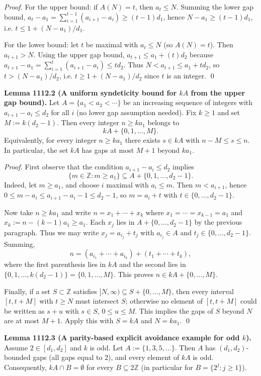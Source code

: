 \emph{Proof.}
For the upper bound: if \(A(N)=t\), then \(a_t\le N\). Summing the lower gap bound,
\(a_t-a_1=\sum_{i=1}^{t-1}(a_{i+1}-a_i)\ge (t-1)d_1\), hence \(N-a_1\ge (t-1)d_1\), i.e.
\(t\le 1+(N-a_1)/d_1\).

For the lower bound: let \(t\) be maximal with \(a_t\le N\) (so \(A(N)=t\)). Then
\(a_{t+1}>N\). Using the upper gap bound,
\(a_{t+1}\le a_1+(t)d_2\) because
\(a_{t+1}-a_1=\sum_{i=1}^{t}(a_{i+1}-a_i)\le t d_2\).
Thus \(N<a_{t+1}\le a_1+t d_2\), so \(t> (N-a_1)/d_2\), i.e.
\(t\ge 1+(N-a_1)/d_2\) since \(t\) is an integer. \qed

\textbf{Lemma 1112.2 (A uniform syndeticity bound for \(kA\) from the upper gap bound).}
Let \(A=\{a_1<a_2<\cdots\}\) be an increasing sequence of integers with \(a_{i+1}-a_i\le d_2\) for all \(i\) (no lower gap assumption needed). Fix \(k\ge 1\) and set
\(M:=k(d_2-1)\).
Then every integer \(n\ge k a_1\) belongs to
\[
 kA + \{0,1,\dots,M\}.
\]
Equivalently, for every integer \(n\ge k a_1\) there exists \(s\in kA\) with \(n-M\le s\le n\). In particular, the set \(kA\) has gaps at most \(M+1\) beyond \(k a_1\).

\emph{Proof.}
First observe that the condition \(a_{i+1}-a_i\le d_2\) implies
\[
\{m\in\mathbb{Z}: m\ge a_1\}\subseteq A+\{0,1,\dots,d_2-1\}.
\]
Indeed, let \(m\ge a_1\), and choose \(i\) maximal with \(a_i\le m\). Then \(m<a_{i+1}\), hence
\(0\le m-a_i\le a_{i+1}-a_i-1\le d_2-1\), so \(m=a_i+t\) with \(t\in\{0,\dots,d_2-1\}\).

Now take \(n\ge k a_1\) and write
\(n = x_1+\cdots+x_k\) where \(x_1=\cdots=x_{k-1}=a_1\) and \(x_k:=n-(k-1)a_1\ge a_1\).
Each \(x_j\) lies in \(A+\{0,\dots,d_2-1\}\) by the previous paragraph. Thus we may write
\(x_j=a_{i_j}+t_j\) with \(a_{i_j}\in A\) and \(t_j\in\{0,\dots,d_2-1\}\). Summing,
\[
 n = (a_{i_1}+\cdots+a_{i_k}) + (t_1+\cdots+t_k),
\]
where the first parenthesis lies in \(kA\) and the second lies in \(\{0,1,\dots,k(d_2-1)\}=\{0,1,\dots,M\}\). This proves \(n\in kA+\{0,\dots,M\}\).

Finally, if a set \(S\subset\mathbb{Z}\) satisfies \([N,\infty)\subseteq S+\{0,\dots,M\}\), then every interval \([t,t+M]\) with \(t\ge N\) must intersect \(S\); otherwise no element of \([t,t+M]\) could be written as \(s+u\) with \(s\in S\), \(0\le u\le M\). This implies the gaps of \(S\) beyond \(N\) are at most \(M+1\). Apply this with \(S=kA\) and \(N=k a_1\). \qed

\textbf{Lemma 1112.3 (A parity-based explicit avoidance example for odd \(k\)).}
Assume \(2\in[d_1,d_2]\) and \(k\) is odd. Let
\(A:=\{1,3,5,\dots\}\). Then \(A\) has \((d_1,d_2)\)-bounded gaps (all gaps equal to \(2\)), and every element of \(kA\) is odd. Consequently, \(kA\cap B=\emptyset\) for every \(B\subseteq 2\mathbb{Z}\) (in particular for \(B=\{2^j:j\ge 1\}\)).

